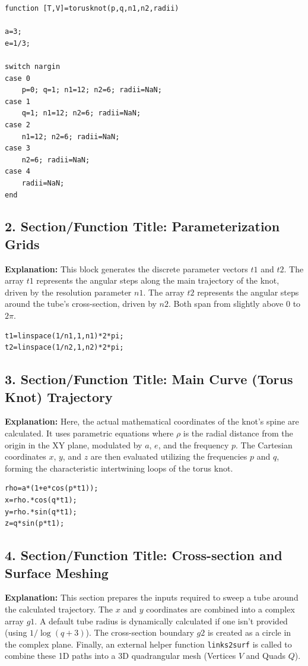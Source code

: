 \begin{lstlisting}
function [T,V]=torusknot(p,q,n1,n2,radii)

a=3;
e=1/3; 

switch nargin
case 0
    p=0; q=1; n1=12; n2=6; radii=NaN;
case 1
    q=1; n1=12; n2=6; radii=NaN;
case 2
    n1=12; n2=6; radii=NaN;
case 3
    n2=6; radii=NaN;
case 4
    radii=NaN;
end
\end{lstlisting}

\subsection*{2. Section/Function Title: Parameterization Grids}
\textbf{Explanation:} This block generates the discrete parameter vectors $t1$ and $t2$. The array $t1$ represents the angular steps along the main trajectory of the knot, driven by the resolution parameter $n1$. The array $t2$ represents the angular steps around the tube's cross-section, driven by $n2$. Both span from slightly above $0$ to $2\pi$.

\begin{lstlisting}
t1=linspace(1/n1,1,n1)*2*pi;
t2=linspace(1/n2,1,n2)*2*pi;
\end{lstlisting}

\subsection*{3. Section/Function Title: Main Curve (Torus Knot) Trajectory}
\textbf{Explanation:} Here, the actual mathematical coordinates of the knot's spine are calculated. It uses parametric equations where $\rho$ is the radial distance from the origin in the XY plane, modulated by $a$, $e$, and the frequency $p$. The Cartesian coordinates $x$, $y$, and $z$ are then evaluated utilizing the frequencies $p$ and $q$, forming the characteristic intertwining loops of the torus knot.

\begin{lstlisting}
rho=a*(1+e*cos(p*t1));
x=rho.*cos(q*t1);
y=rho.*sin(q*t1); 
z=q*sin(p*t1);
\end{lstlisting}

\subsection*{4. Section/Function Title: Cross-section and Surface Meshing}
\textbf{Explanation:} This section prepares the inputs required to sweep a tube around the calculated trajectory. The $x$ and $y$ coordinates are combined into a complex array $g1$. A default tube radius is dynamically calculated if one isn't provided (using $1/\log(q+3)$). The cross-section boundary $g2$ is created as a circle in the complex plane. Finally, an external helper function \texttt{links2surf} is called to combine these 1D paths into a 3D quadrangular mesh (Vertices $V$ and Quads $Q$).

